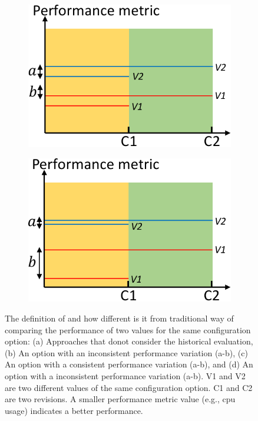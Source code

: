 \begin{figure}[t]
        \begin{subfigure}{0.25\textwidth}
                \includegraphics[width=\linewidth]{Figures/background-c.pdf}
                \caption{}
                \label{fig:description-c}
        \end{subfigure}%
        \begin{subfigure}{0.25\textwidth}
                \includegraphics[width=\linewidth]{Figures/background-d.pdf}
                \caption{}
                \label{fig:description-d}
        \end{subfigure}%
	\caption{The definition of \inconsistent and how different is it from traditional way of comparing the performance of two values for the same configuration option: (a) Approaches that donot consider the historical evaluation, (b) An option with an inconsistent performance variation (a-b), (c) An option with a consistent performance variation (a-b), and (d) An option with a inconsistent performance variation (a-b). V1 and V2 are two different values of the same configuration option. C1 and C2 are two revisions. A smaller performance metric value (e.g., cpu usage) indicates a better performance.
}
\end{figure}

